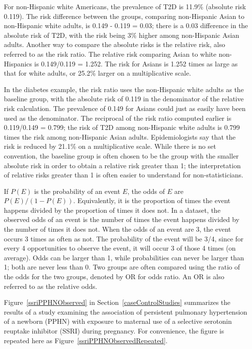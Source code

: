 For non-Hispanic white Americans, the prevalence of T2D is 11.9\% (absolute risk 0.119). The risk difference between the groups, comparing non-Hispanic Asian to non-Hispanic white adults, is 0.149 - 0.119 = 0.03; there is a 0.03 difference in the absolute risk of T2D, with the risk being 3\% higher among non-Hispanic Asian adults. Another way to compare the absolute risks is the relative risk, also referred to as the risk ratio. The relative risk comparing Asian to white non-Hispanics is 0.149/0.119 = 1.252.  The risk for Asians is 1.252 times as large as that for white adults, or 25.2\% larger on a multiplicative scale. 

In the diabetes example, the risk ratio uses the non-Hispanic white adults as the baseline group, with the absolute risk of 0.119 in the denominator of the relative risk calculation. The prevalence of 0.149 for Asians could just as easily have been used as the denominator. The reciprocal of the risk ratio computed earlier is 0.119/0.149 = 0.799; the risk of T2D among non-Hispanic white adults is 0.799 times the risk among non-Hispanic Asian adults.  Epidemiologists say that the risk is reduced by 21.1\% on a multiplicative scale.  While there is no set convention, the baseline group is often chosen to be the group with the smaller absolute risk in order to obtain a relative risk greater than 1; the interpretation of relative risks greater than 1 is often easier to understand for non-statisticians. 

If $P(E)$ is the probability of an event $E$, the odds of $E$ are $P(E)/(1 - P(E))$.  Equivalently, it is the proportion of times the event happens divided by the proportion of times it does not.   In a dataset, the observed odds of an event is the number of times the event happens divided by the number of times it does not. When the odds of an event are 3, the event occurs 3 times as often as not.  The probability of the event will be 3/4, since for every 4 opportunities to observe the event, it will occur 3 of those 4 times (on average).   Odds can be larger than 1, while probabilities can never be larger than 1; both are never less than 0.  Two groups are often compared using the ratio of the odds for the two groups, denoted by OR for odds ratio. An OR is also referred to as the relative odds.  

Figure~\ref{ssriPPHNObserved} in Section~\ref{caseControlStudies} summarizes the results of a study examining the association of persistent pulmonary hypertension of a newborn (PPHN) with exposure to maternal use of a selective serotonin reuptake inhibitor (SSRI) during pregnancy. For convenience, the figure is repeated here as Figure~\ref{ssriPPHNObservedRepeated}.

